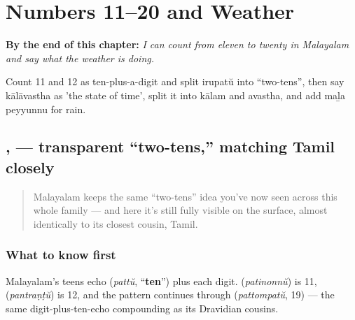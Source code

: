 
\chapter{Numbers 11–20 and Weather}
\label{ch:ml-numbers-and-weather}

\begin{chapteropening}
\textbf{By the end of this chapter:} \emph{I can count from eleven to twenty in Malayalam and say what the weather is doing.}

Count 11 and 12 as ten-plus-a-digit and split irupatŭ into \textquotedblleft{}two-tens\textquotedblright{}, then say kālāvastha as 'the state of time', split it into kālam and avastha, and add maḻa peyyunnu for rain.
\end{chapteropening}

\section[\texorpdfstring{\ml{പതിനൊന്ന്} — \ml{ഇരുപത്} (patinonnŭ — irupatŭ)}{പതിനൊന്ന് — ഇരുപത് (patinonnŭ — irupatŭ)}]{,  — transparent \textquotedblleft{}two-tens,\textquotedblright{} matching Tamil closely}

\label{lesson:ML-C20-pathinonnu-irupathu}



\begin{quote}
Malayalam keeps the same \textquotedblleft{}two-tens\textquotedblright{} idea you've now seen across this whole family — and here it's still fully visible on the surface, almost identically to its closest cousin, Tamil.
\end{quote}

\subsection*{What to know first}
Malayalam's teens echo \textbf{} (\emph{pattŭ}, \textquotedblleft{}\textbf{ten}\textquotedblright{}) plus each digit. \textbf{} (\emph{patinonnŭ}) is 11, \textbf{} (\emph{pantraṇṭŭ}) is 12, and the pattern continues through \textbf{} (\emph{pattompatŭ}, 19) — the same digit-plus-ten-echo compounding as its Dravidian cousins.

